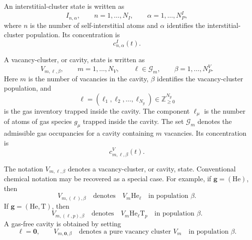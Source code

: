An interstitial-cluster state is written as
\begin{equation}
    I_{n,\alpha},
    \qquad
    n=1,\ldots,N_I,
    \qquad
    \alpha=1,\ldots,N_P^I,
    \label{eq:I_state}
\end{equation}
where $n$ is the number of self-interstitial atoms and $\alpha$ identifies the
interstitial-cluster population. Its concentration is
\begin{equation}
    c^I_{n,\alpha}(t).
    \label{eq:I_concentration}
\end{equation}

A vacancy-cluster, or cavity, state is written as
\begin{equation}
    V_{m,\boldsymbol{\ell},\beta},
    \qquad
    m=1,\ldots,N_V,
    \qquad
    \boldsymbol{\ell}\in\mathcal{G}_m,
    \qquad
    \beta=1,\ldots,N_P^V .
    \label{eq:V_state}
\end{equation}
Here $m$ is the number of vacancies in the cavity, $\beta$ identifies the
vacancy-cluster population, and
\begin{equation}
    \boldsymbol{\ell}
    =
    (\ell_1,\ell_2,\ldots,\ell_{N_g})
    \in \mathbb{Z}_{\geq 0}^{N_g}
    \label{eq:gas_occupancy_vector}
\end{equation}
is the gas inventory trapped inside the cavity. The component $\ell_\mu$ is
the number of atoms of gas species $g_\mu$ trapped inside the cavity. The set
$\mathcal{G}_m$ denotes the admissible gas occupancies for a cavity containing
$m$ vacancies. Its concentration is
\begin{equation}
    c^V_{m,\boldsymbol{\ell},\beta}(t).
    \label{eq:V_concentration}
\end{equation}

The notation $V_{m,\boldsymbol{\ell},\beta}$ denotes a vacancy-cluster, or cavity, state. Conventional chemical notation may be recovered as a
special case. For example, if $\mathbf{g}=(\mathrm{He})$, then
\begin{equation}
    V_{m,(\ell),\beta}
    \quad\text{denotes}\quad
    V_m\mathrm{He}_{\ell}
    \quad\text{in population }\beta .
\end{equation}
If $\mathbf{g}=(\mathrm{He},\mathrm{T})$, then
\begin{equation}
    V_{m,(\ell,p),\beta}
    \quad\text{denotes}\quad
    V_m\mathrm{He}_{\ell}\mathrm{T}_{p}
    \quad\text{in population }\beta .
\end{equation}
A gas-free cavity is obtained by setting
\begin{equation}
    \boldsymbol{\ell}=\mathbf{0},
    \qquad
    V_{m,\mathbf{0},\beta}
    \quad\text{denotes a pure vacancy cluster }V_m
    \quad\text{in population }\beta .
\end{equation}

